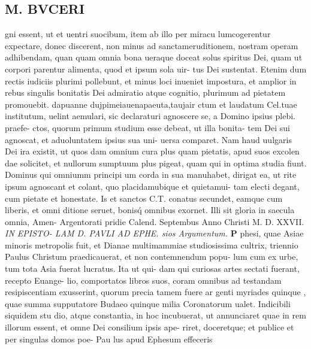 \documentclass{article}
\begin{document}
\begin{pages}
\section*{M. BVCERI }\pstart gni essent, ut et uentri suocibum, item ab illo per miracu lumcogerentur expectare, donec discerent, non minus ad sanctameruditionem, nostram operam adhibendam, quan quam omnia bona ueraque doceat solus spiritus Dei, quam ut corpori parentur alimenta, quod et ipsum sola uir- tus Dei sustentat. Etenim dum rectis iudiciis plurimi pollebunt, et minus loci inueniet impostura, et amplior in rebus singulis bonitatis Dei admiratio atque cognitio, plurimum ad pietatem promouebit.  \pend\pstart dapuanne dujpimeiauenapaeuta,taujair ctum et laudatum Cel.tuae institutum, uelint aemulari, sic declaraturi agnoscere se, a Domino ipsius plebi. praefe- ctos, quorum primum studium esse debeat, ut illa bonita- tem Dei sui agnoscat, et aduoluntatem ipsius sua uni- uersa comparet. Nam haud uulgaris Dei ira existit, ut quos dam omnium cura plus quam pietatis, apud suos excolen dae solicitet, et nullorum sumptuum plus pigeat, quam qui in optima studia fiunt. Dominus qui omniumm principi um corda in sua manuhabet, dirigat ea, ut rite ipsum agnoscant et colant, quo placidamubique et quietamui- tam electi degant, cum pietate et honestate. Is et sanctos C.T. conatus secundet, eamque cum liberis, et omni ditione seruet, bonisq́ omnibus exornet.  Illi sit gloria in saecula omnia, Amen- Argentorati pridie Calend. Septembus  Anno Christi M. D. XXVII.  \pend
\textit{IN EPISTO- LAM D. PAVLI AD EPHE.  sios Argumentum.  }
\textbf{P }\pstart phesi, quae Asiae minoris metropolis fuit, et Dianae multimammiae studiosissima cultrix, triennio Paulus Christum praedicauerat, et non contemnendum popu- lum cum ex urbe, tum tota Asia fuerat lucratus. Ita ut qui- dam qui curiosas artes sectati fuerant, recepto Euange- lio, comportatos libros suos, coram omnibus ad testandam resipiscentiam exusserint, quorum precia tamem fuere ar genti myriades quinque , quae summa supputatore Budaeo quinque milia Coronatorum ualet.  Indicibili siquidem stu dio, atque constantia, in hoc incubuerat, ut annunciaret quae in rem illorum essent, et omne Dei consilium ipsis ape- riret, doceretque; et publice et per singulas domos poe-  \pendQuae Pau lus apud Ephesum effeceris 

\end{pages}
\end{document}
